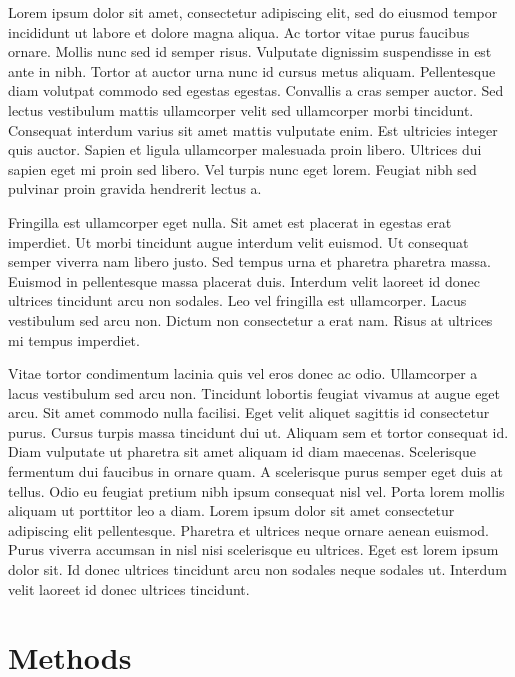 \documentclass[aip,preprint]{revtex4-1}
\begin{document}
    Lorem ipsum dolor sit amet, consectetur adipiscing elit, sed do eiusmod tempor incididunt ut labore et dolore magna aliqua.
    Ac tortor vitae purus faucibus ornare.
    Mollis nunc sed id semper risus.
    Vulputate dignissim suspendisse in est ante in nibh.
    Tortor at auctor urna nunc id cursus metus aliquam.
    Pellentesque diam volutpat commodo sed egestas egestas.
    Convallis a cras semper auctor.
    Sed lectus vestibulum mattis ullamcorper velit sed ullamcorper morbi tincidunt.
    Consequat interdum varius sit amet mattis vulputate enim.
    Est ultricies integer quis auctor.
    Sapien et ligula ullamcorper malesuada proin libero.
    Ultrices dui sapien eget mi proin sed libero.
    Vel turpis nunc eget lorem.
    Feugiat nibh sed pulvinar proin gravida hendrerit lectus a.

    Fringilla est ullamcorper eget nulla.
    Sit amet est placerat in egestas erat imperdiet.
    Ut morbi tincidunt augue interdum velit euismod.
    Ut consequat semper viverra nam libero justo.
    Sed tempus urna et pharetra pharetra massa.
    Euismod in pellentesque massa placerat duis.
    Interdum velit laoreet id donec ultrices tincidunt arcu non sodales.
    Leo vel fringilla est ullamcorper.
    Lacus vestibulum sed arcu non.
    Dictum non consectetur a erat nam.
    Risus at ultrices mi tempus imperdiet.

    Vitae tortor condimentum lacinia quis vel eros donec ac odio.
    Ullamcorper a lacus vestibulum sed arcu non.
    Tincidunt lobortis feugiat vivamus at augue eget arcu.
    Sit amet commodo nulla facilisi.
    Eget velit aliquet sagittis id consectetur purus.
    Cursus turpis massa tincidunt dui ut.
    Aliquam sem et tortor consequat id.
    Diam vulputate ut pharetra sit amet aliquam id diam maecenas.
    Scelerisque fermentum dui faucibus in ornare quam.
    A scelerisque purus semper eget duis at tellus.
    Odio eu feugiat pretium nibh ipsum consequat nisl vel.
    Porta lorem mollis aliquam ut porttitor leo a diam.
    Lorem ipsum dolor sit amet consectetur adipiscing elit pellentesque.
    Pharetra et ultrices neque ornare aenean euismod.
    Purus viverra accumsan in nisl nisi scelerisque eu ultrices.
    Eget est lorem ipsum dolor sit.
    Id donec ultrices tincidunt arcu non sodales neque sodales ut.
    Interdum velit laoreet id donec ultrices tincidunt.

    \section{Methods}
    \label{sec:methods}
\end{document}
